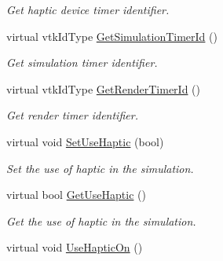 \begin{DoxyCompactItemize}
\begin{DoxyCompactList}\small\item\em Get haptic device timer identifier. \item\end{DoxyCompactList}\item 
\hypertarget{classvtkSimulation_ac7453c6297811b6dfbbd8ed0a6088269}{
virtual vtkIdType \hyperlink{classvtkSimulation_ac7453c6297811b6dfbbd8ed0a6088269}{GetSimulationTimerId} ()}
\label{classvtkSimulation_ac7453c6297811b6dfbbd8ed0a6088269}

\begin{DoxyCompactList}\small\item\em Get simulation timer identifier. \item\end{DoxyCompactList}\item 
\hypertarget{classvtkSimulation_a17648113f5a793c53b43c2f2edb4c4f5}{
virtual vtkIdType \hyperlink{classvtkSimulation_a17648113f5a793c53b43c2f2edb4c4f5}{GetRenderTimerId} ()}
\label{classvtkSimulation_a17648113f5a793c53b43c2f2edb4c4f5}

\begin{DoxyCompactList}\small\item\em Get render timer identifier. \item\end{DoxyCompactList}\item 
\hypertarget{classvtkSimulation_aec79fdb945c8d8c313b41ead331e4595}{
virtual void \hyperlink{classvtkSimulation_aec79fdb945c8d8c313b41ead331e4595}{SetUseHaptic} (bool)}
\label{classvtkSimulation_aec79fdb945c8d8c313b41ead331e4595}

\begin{DoxyCompactList}\small\item\em Set the use of haptic in the simulation. \item\end{DoxyCompactList}\item 
\hypertarget{classvtkSimulation_a8aa52a25a3b57e2ddf62ee533475be57}{
virtual bool \hyperlink{classvtkSimulation_a8aa52a25a3b57e2ddf62ee533475be57}{GetUseHaptic} ()}
\label{classvtkSimulation_a8aa52a25a3b57e2ddf62ee533475be57}

\begin{DoxyCompactList}\small\item\em Get the use of haptic in the simulation. \item\end{DoxyCompactList}\item 
\hypertarget{classvtkSimulation_ac3dae247fab690b1c9bb3cb32755dc64}{
virtual void \hyperlink{classvtkSimulation_ac3dae247fab690b1c9bb3cb32755dc64}{UseHapticOn} ()}
\label{classvtkSimulation_ac3dae247fab690b1c9bb3cb32755dc64}


\end{DoxyCompactItemize}
